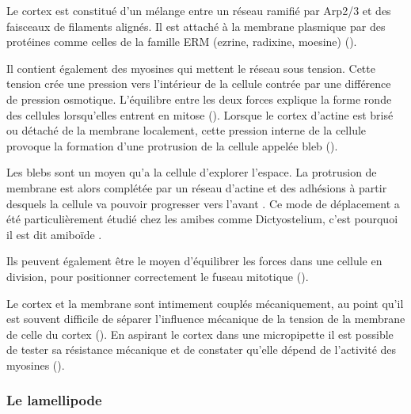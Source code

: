 Le cortex est constitué d'un mélange entre un réseau ramifié par Arp2/3 et des faisceaux de filaments alignés. 
Il est attaché à la membrane plasmique par des protéines comme celles de la famille ERM (ezrine, radixine, moesine) (\cite{biro_cell_2013}). 

Il contient également des myosines qui mettent le réseau sous tension. Cette tension crée une pression vers l'intérieur de la cellule contrée par une différence de pression osmotique. L'équilibre entre les deux forces explique la forme ronde des cellules lorsqu'elles entrent en mitose (\cite{stewart_hydrostatic_2011}).
Lorsque le cortex d'actine est brisé ou détaché de la membrane localement, cette pression interne de la cellule provoque la formation d'une protrusion de la cellule appelée bleb (\cite{paluch_cortical_2005}).

Les blebs sont un moyen qu'a la cellule d'explorer l'espace. La protrusion de membrane est alors complétée par un réseau d'actine et des adhésions à partir desquels la cellule va pouvoir progresser vers l'avant \cite{charras_blebs_2008}. 
Ce mode de déplacement a été particulièrement étudié chez les amibes comme Dictyostelium, c'est pourquoi il est dit \og amiboïde \fg.  

Ils peuvent également être le moyen d'équilibrer les forces dans une cellule en division, pour positionner correctement le fuseau mitotique (\cite{sedzinski_polar_2011}).

Le cortex et la membrane sont intimement couplés mécaniquement, au point qu'il est souvent difficile de séparer l'influence mécanique de la tension de la membrane de celle du cortex (\cite{campillo_mechanics_2012}). 
En aspirant le cortex dans une micropipette il est possible de tester sa résistance mécanique et de constater qu'elle dépend de l'activité des myosines (\cite{bergert_cell_2012}).  



\subsubsection{Le lamellipode}

